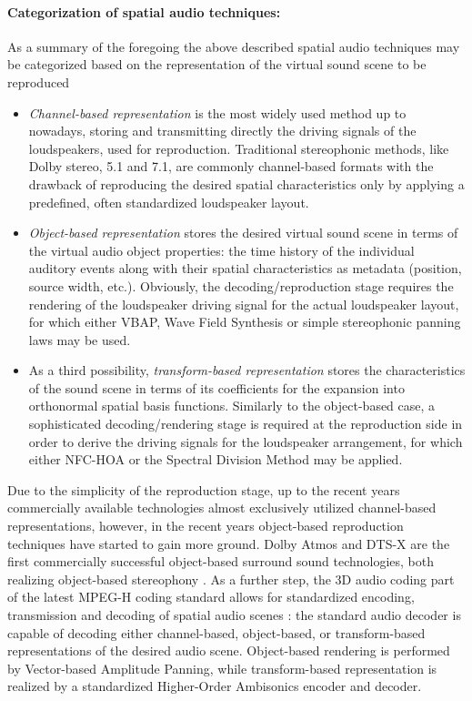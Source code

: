 \paragraph{Categorization of spatial audio techniques:}
As a summary of the foregoing the above described spatial audio techniques may be categorized based on the representation of the virtual sound scene to be reproduced \cite{Spors2013:Survey}
\begin{itemize}
\item \emph{Channel-based representation} is the most widely used method up to nowadays, storing and transmitting directly the driving signals of the loudspeakers, used for reproduction.
Traditional stereophonic methods, like Dolby stereo, 5.1 and 7.1, are commonly channel-based formats with the drawback of reproducing the desired spatial characteristics only by applying a predefined, often standardized loudspeaker layout.
%
\item \emph{Object-based representation} stores the desired virtual sound scene in terms of the virtual audio object properties: the time history of the individual auditory events along with their spatial characteristics as metadata (position, source width, etc.).
Obviously, the decoding/reproduction stage requires the rendering of the loudspeaker driving signal for the actual loudspeaker layout, for which either VBAP, Wave Field Synthesis or simple stereophonic panning laws may be used.
%
\item As a third possibility, \emph{transform-based representation} stores the characteristics of the sound scene in terms of its coefficients for the expansion into  orthonormal spatial basis functions.
Similarly to the object-based case, a sophisticated decoding/rendering stage is required at the reproduction side in order to derive the driving signals for the loudspeaker arrangement, for which either NFC-HOA or the Spectral Division Method may be applied.
\end{itemize}

Due to the simplicity of the reproduction stage, up to the recent years commercially available technologies almost exclusively utilized channel-based representations,
however, in the recent years object-based reproduction techniques have started to gain more ground.
Dolby Atmos and DTS-X are the first commercially successful object-based surround sound technologies, both realizing object-based stereophony \cite{Atmos}.
As a further step, the 3D audio coding part of the latest MPEG-H coding standard allows for standardized encoding, transmission and decoding of spatial audio scenes \cite{herre2015mpeg, 7056445}:
the standard audio decoder is capable of decoding either channel-based, object-based, or transform-based representations of the desired audio scene.
Object-based rendering is performed by Vector-based Amplitude Panning, while transform-based representation is realized by a standardized Higher-Order Ambisonics encoder and decoder.

